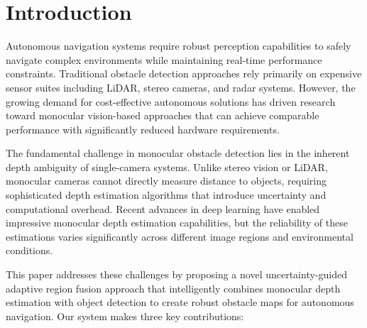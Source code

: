 \documentclass[12pt,oneside]{book}
\makeatletter
\renewcommand{\thefigure}{\Roman{figure}}
\renewcommand{\tablename}{TABLE}
\renewcommand{\thetable}{\Roman{table}}
\renewcommand{\fnum@table}{\tablename~\thetable}
\makeatother
\begin{document}
\listoffigures
\clearpage

\renewcommand{\listtablename}{LIST OF TABLES}
\renewcommand{\tablename}{TABLE}
\renewcommand{\thetable}{\Roman{table}}
\makeatletter
\renewcommand{\fnum@table}{\tablename~\thefigure}
\makeatother

\listoftables
\clearpage


\chapter{Introduction}

Autonomous navigation systems require robust perception capabilities to safely navigate complex environments while maintaining real-time performance constraints. Traditional obstacle detection approaches rely primarily on expensive sensor suites including LiDAR, stereo cameras, and radar systems. However, the growing demand for cost-effective autonomous solutions has driven research toward monocular vision-based approaches that can achieve comparable performance with significantly reduced hardware requirements.

The fundamental challenge in monocular obstacle detection lies in the inherent depth ambiguity of single-camera systems. Unlike stereo vision or LiDAR, monocular cameras cannot directly measure distance to objects, requiring sophisticated depth estimation algorithms that introduce uncertainty and computational overhead. Recent advances in deep learning have enabled impressive monocular depth estimation capabilities, but the reliability of these estimations varies significantly across different image regions and environmental conditions.

This paper addresses these challenges by proposing a novel uncertainty-guided adaptive region fusion approach that intelligently combines monocular depth estimation with object detection to create robust obstacle maps for autonomous navigation. Our system makes three key contributions:
\end{document}
